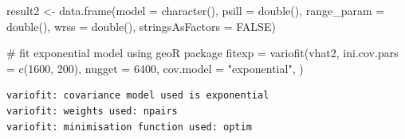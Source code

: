 \documentclass[
  letterpaper,
  DIV=11,
  numbers=noendperiod]{scrartcl}
\newenvironment{Shaded}{\begin{snugshade}}{\end{snugshade}}
\newcommand{\AttributeTok}[1]{\textcolor[rgb]{0.40,0.45,0.13}{#1}}
\newcommand{\CommentTok}[1]{\textcolor[rgb]{0.37,0.37,0.37}{#1}}
\newcommand{\ConstantTok}[1]{\textcolor[rgb]{0.56,0.35,0.01}{#1}}
\newcommand{\DecValTok}[1]{\textcolor[rgb]{0.68,0.00,0.00}{#1}}
\newcommand{\FunctionTok}[1]{\textcolor[rgb]{0.28,0.35,0.67}{#1}}
\newcommand{\NormalTok}[1]{\textcolor[rgb]{0.00,0.23,0.31}{#1}}
\newcommand{\OtherTok}[1]{\textcolor[rgb]{0.00,0.23,0.31}{#1}}
\newcommand{\SpecialCharTok}[1]{\textcolor[rgb]{0.37,0.37,0.37}{#1}}
\newcommand{\StringTok}[1]{\textcolor[rgb]{0.13,0.47,0.30}{#1}}
\begin{document}
\begin{Shaded}
\begin{Highlighting}[]
\NormalTok{result2 }\OtherTok{\textless{}{-}} \FunctionTok{data.frame}\NormalTok{(}\AttributeTok{model =} \FunctionTok{character}\NormalTok{(), }
                 \AttributeTok{psill =} \FunctionTok{double}\NormalTok{(), }
                 \AttributeTok{range\_param =} \FunctionTok{double}\NormalTok{(),}
                 \AttributeTok{wrss =} \FunctionTok{double}\NormalTok{(),}
                 \AttributeTok{stringsAsFactors =} \ConstantTok{FALSE}\NormalTok{)}

\CommentTok{\# fit exponential model using geoR package}
\NormalTok{fitexp }\OtherTok{=} \FunctionTok{variofit}\NormalTok{(vhat2, }\AttributeTok{ini.cov.pars =} \FunctionTok{c}\NormalTok{(}\DecValTok{1600}\NormalTok{, }\DecValTok{200}\NormalTok{),}
                  \AttributeTok{nugget =} \DecValTok{6400}\NormalTok{,}
                  \AttributeTok{cov.model =} \StringTok{"exponential"}\NormalTok{,}
\NormalTok{                  )}
\end{Highlighting}
\end{Shaded}

\begin{verbatim}
variofit: covariance model used is exponential 
variofit: weights used: npairs 
variofit: minimisation function used: optim 
\end{verbatim}

\begin{Shaded}
\end{Shaded}
\end{document}
